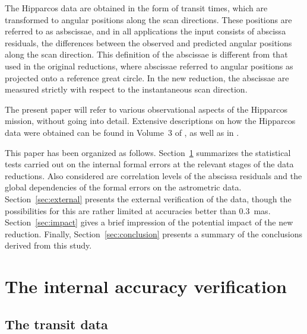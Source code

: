 \documentclass{aa}
\begin{document}
The Hipparcos data are obtained in the form of transit times, which are
transformed to angular positions along the scan directions. These positions
are referred to as asbscissae, and in all applications the input
consists of abscissa residuals, the differences between the observed and
predicted angular positions along the scan direction. This definition of the
abscissae is different from that used in the original reductions, where
abscissae referred to angular positions as projected onto a reference great 
circle. In the new reduction, the abscissae are measured strictly with 
respect to the instantaneous scan direction.

The present paper will refer to various observational aspects of the 
Hipparcos mission, without going into detail. Extensive descriptions
on how the Hipparcos data were obtained can be found in Volume~3 of
\citet{esa97}, as well as in \citep{fvl07}. 

This paper has been organized as follows. Section~\ref{sec:internal}
summarizes the statistical tests carried out on the internal formal 
errors at the relevant stages of the data reductions. Also considered
are correlation levels of the abscissa residuals and the global
dependencies of the formal errors on the astrometric data.
Section~\ref{sec:external} presents the external verification of the
data, though the possibilities for this are rather limited at 
accuracies better than 0.3~mas. Section~\ref{sec:impact} gives a brief
impression of the potential impact of the new reduction. Finally, 
Section~\ref{sec:conclusion} presents a summary of the conclusions 
derived from this study. 
 
\section{The internal accuracy verification}
\label{sec:internal}

\subsection{The transit data}
\end{document}
